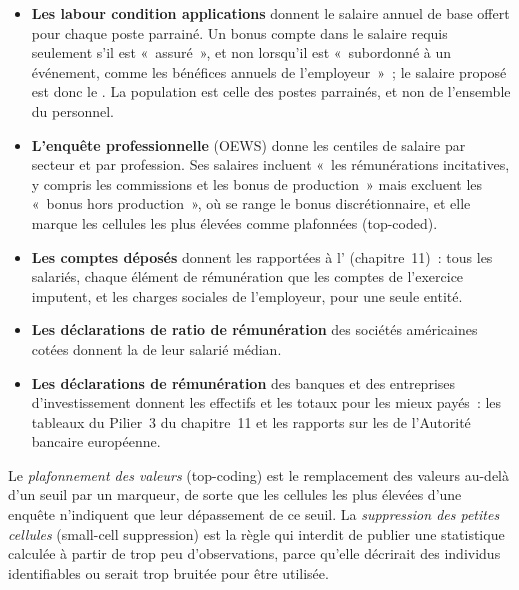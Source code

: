 \begin{itemize}
\item \textbf{Les labour condition applications} donnent le salaire annuel de base offert pour chaque poste parrainé. Un bonus compte
dans le salaire requis seulement s'il est «~assuré~», et non lorsqu'il est «~subordonné à un événement, comme les bénéfices annuels de
l'employeur~»~; le salaire proposé est donc le . La population est celle des postes parrainés, et non de l'ensemble du personnel.
\item \textbf{L'enquête professionnelle} (OEWS) donne les centiles de salaire par secteur et par profession. Ses salaires incluent
«~les rémunérations incitatives, y compris les commissions et les bonus de production~» mais excluent les «~bonus hors production~», où se range le
bonus discrétionnaire, et elle marque les cellules les plus élevées comme plafonnées (top-coded).
\item \textbf{Les comptes déposés} donnent les  rapportées à l' (chapitre~11)~: tous les salariés, chaque élément de
rémunération que les comptes de l'exercice imputent, et les charges sociales de l'employeur, pour une seule entité.
\item \textbf{Les déclarations de ratio de rémunération} des sociétés américaines cotées donnent la  de leur salarié médian.
\item \textbf{Les déclarations de rémunération} des banques et des entreprises d'investissement donnent les effectifs et les totaux pour les mieux payés~:
les tableaux du Pilier~3 du chapitre~11 et les rapports sur les  de l'Autorité bancaire européenne.
\end{itemize}

\begin{definition}\label{def:in:pay-levels-by-role-firm-type-and-seniority:suppress}
Le \emph{plafonnement des valeurs} (top-coding) est le remplacement des valeurs au-delà d'un seuil par un marqueur, de sorte que les cellules les plus élevées d'une enquête
n'indiquent que leur dépassement de ce seuil. La \emph{suppression des petites cellules} (small-cell suppression) est la règle qui interdit de publier une statistique calculée à partir de trop peu d'observations,
parce qu'elle décrirait des individus identifiables ou serait trop bruitée
pour être utilisée.
\end{definition}

